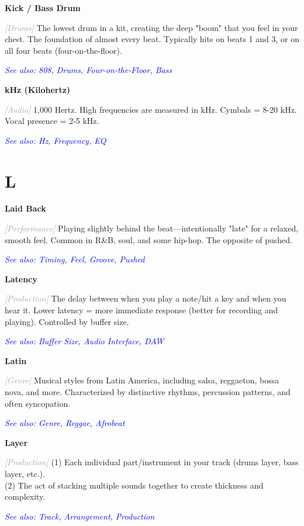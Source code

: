 \documentclass[11pt,letterpaper]{article}
\newcommand{\term}[1]{\textbf{\large\color{purple}#1}}
\newcommand{\category}[1]{\textcolor{darkgray}{\textit{\small [#1]}}}
\newcommand{\seealso}[1]{\textcolor{blue}{\textit{See also: #1}}}
\newenvironment{termdef}[1]
  {\noindent\term{#1}\par\nopagebreak}
  {\par\vspace{0.3em}}
\begin{document}
\begin{termdef}{Kick / Bass Drum}
\category{Drums}
The lowest drum in a kit, creating the deep "boom" that you feel in your chest. The foundation of almost every beat. Typically hits on beats 1 and 3, or on all four beats (four-on-the-floor).

\seealso{808, Drums, Four-on-the-Floor, Bass}
\end{termdef}

\begin{termdef}{kHz (Kilohertz)}
\category{Audio}
1,000 Hertz. High frequencies are measured in kHz. Cymbals = 8-20 kHz. Vocal presence = 2-5 kHz.

\seealso{Hz, Frequency, EQ}
\end{termdef}

\newpage


\section*{L}

\begin{termdef}{Laid Back}
\category{Performance}
Playing slightly behind the beat—intentionally "late" for a relaxed, smooth feel. Common in R\&B, soul, and some hip-hop. The opposite of pushed.

\seealso{Timing, Feel, Groove, Pushed}
\end{termdef}

\begin{termdef}{Latency}
\category{Production}
The delay between when you play a note/hit a key and when you hear it. Lower latency = more immediate response (better for recording and playing). Controlled by buffer size.

\seealso{Buffer Size, Audio Interface, DAW}
\end{termdef}

\begin{termdef}{Latin}
\category{Genre}
Musical styles from Latin America, including salsa, reggaeton, bossa nova, and more. Characterized by distinctive rhythms, percussion patterns, and often syncopation.

\seealso{Genre, Reggae, Afrobeat}
\end{termdef}

\begin{termdef}{Layer}
\category{Production}
(1) Each individual part/instrument in your track (drums layer, bass layer, etc.). \\
(2) The act of stacking multiple sounds together to create thickness and complexity.

\seealso{Track, Arrangement, Production}
\end{termdef}
\end{document}
